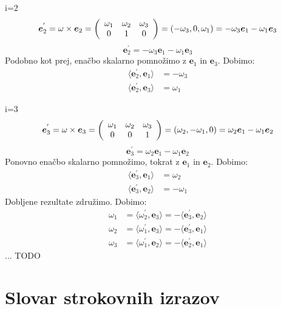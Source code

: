 \documentclass[mat1]{fmfdelo}
\newcommand{\e}{\boldsymbol e}
\begin{document}
\begin{dokaz}
i=2
\begin{equation*}
\e_2^{'} = \omega \times \e_2 = \left(
\begin{array}{c c c}
\omega_1 & \omega_2 & \omega_3 \\
0 & 1 & 0
\end{array} \right)
= (-\omega_3, 0,\omega_1) = -\omega_3\e_1 - \omega_1\e_3
\end{equation*}
\begin{equation*}
\e_2^{'} = -\omega_3\e_1-\omega_1\e_3
\end{equation*}
Podobno kot prej, enačbo skalarno pomnožimo z $\e_1$ in $\e_3$. Dobimo:
\begin{equation*}
\begin{split}
\langle \e_2^{'}, \e_1 \rangle & = -\omega_3 \\
\langle \e_2^{'}, \e_3 \rangle &= \omega_1
\end{split}
\end{equation*}

i=3
\begin{equation*}
\e_3^{'} = \omega \times \e_3 = \left(
\begin{array}{c c c}
\omega_1 & \omega_2 & \omega_3 \\
0 & 0 & 1
\end{array} \right)
= (\omega_2, -\omega_1,0) = \omega_2\e_1 - \omega_1\e_2
\end{equation*}
\begin{equation*}
\e_3^{'} = \omega_2\e_1-\omega_1\e_2
\end{equation*}
Ponovno enačbo skalarno pomnožimo, tokrat z $\e_1$ in $\e_2$. Dobimo:
\begin{equation*}
\begin{split}
\langle \e_3^{'}, \e_1 \rangle & = \omega_2 \\
\langle \e_3^{'}, \e_2 \rangle &= -\omega_1
\end{split}
\end{equation*}
Dobljene rezultate združimo. Dobimo:
\begin{equation}
\begin{split}
\omega_1 &= \langle \omega_2^{'}, \e_3 \rangle = - \langle \e_3^{'}, \e_2 \rangle \\
\omega_2 &= \langle \omega_1^{'}, \e_3 \rangle = - \langle \e_3^{'}, \e_1 \rangle \\
\omega_3 &= \langle \omega_1^{'}, \e_2 \rangle = - \langle \e_2^{'}, \e_1 \rangle 
\end{split}
\end{equation}
... TODO


\end{dokaz}



\section*{Slovar strokovnih izrazov}

\geslo{}{}
\geslo{}{}

\begin{thebibliography}{99}


\end{thebibliography}
\end{document}
